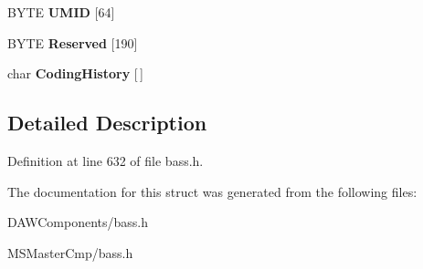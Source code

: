 \begin{DoxyCompactItemize}
\item 
\hypertarget{struct_t_a_g___b_e_x_t_a3aa7ac7da2b51c4747c9672ecc9f0b41_a3aa7ac7da2b51c4747c9672ecc9f0b41}{B\-Y\-T\-E {\bfseries U\-M\-I\-D} \mbox{[}64\mbox{]}}\label{struct_t_a_g___b_e_x_t_a3aa7ac7da2b51c4747c9672ecc9f0b41_a3aa7ac7da2b51c4747c9672ecc9f0b41}

\item 
\hypertarget{struct_t_a_g___b_e_x_t_aa752e8298cc5ecf8ce3bd2698d6307a0_aa752e8298cc5ecf8ce3bd2698d6307a0}{B\-Y\-T\-E {\bfseries Reserved} \mbox{[}190\mbox{]}}\label{struct_t_a_g___b_e_x_t_aa752e8298cc5ecf8ce3bd2698d6307a0_aa752e8298cc5ecf8ce3bd2698d6307a0}

\item 
\hypertarget{struct_t_a_g___b_e_x_t_a015b227447c52eb1ff4c3e6e9d0225de_a015b227447c52eb1ff4c3e6e9d0225de}{char {\bfseries Coding\-History} \mbox{[}$\,$\mbox{]}}\label{struct_t_a_g___b_e_x_t_a015b227447c52eb1ff4c3e6e9d0225de_a015b227447c52eb1ff4c3e6e9d0225de}

\end{DoxyCompactItemize}


\subsection{Detailed Description}


Definition at line 632 of file bass.\-h.



The documentation for this struct was generated from the following files\-:\begin{DoxyCompactItemize}
\item 
D\-A\-W\-Components/bass.\-h\item 
M\-S\-Master\-Cmp/bass.\-h\end{DoxyCompactItemize}
